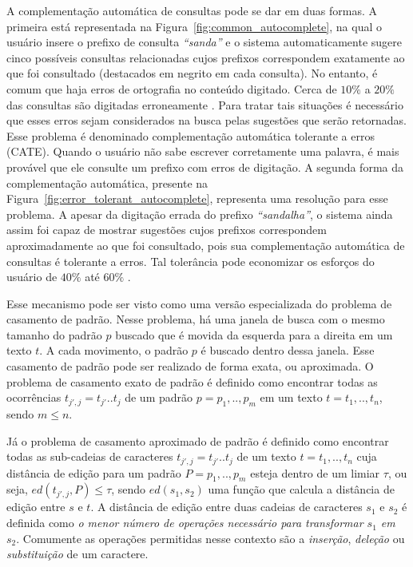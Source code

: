 A complementação automática de consultas pode se dar em duas formas. A primeira está representada na Figura~\ref{fig:common_autocomplete}, na qual o usuário insere o prefixo de consulta \textit{``sanda''} e o sistema automaticamente sugere cinco possíveis consultas relacionadas cujos prefixos correspondem exatamente ao que foi consultado (destacados em negrito em cada consulta). No entanto, é comum que haja erros de ortografia no conteúdo digitado. Cerca de $10\%$ a $20\%$ das consultas são digitadas erroneamente \citep{broder2009}. Para tratar tais situações é necessário que esses erros sejam considerados na busca pelas sugestões que serão retornadas. Esse problema é denominado complementação automática  tolerante a erros (CATE). Quando o usuário não sabe escrever corretamente uma palavra, é mais provável que ele consulte um prefixo com erros de digitação. A segunda forma da complementação automática, presente na Figura~\ref{fig:error_tolerant_autocomplete}, representa uma resolução para esse problema. A apesar da digitação errada do prefixo \textit{``sandalha''}, o sistema ainda assim foi capaz de mostrar sugestões cujos prefixos correspondem aproximadamente ao que foi consultado, pois sua complementação automática de consultas é tolerante a erros. Tal tolerância pode economizar os esforços do usuário de $40\%$ até $60\%$ \citep{ji2009efficient}.

Esse mecanismo pode ser visto como uma versão especializada do problema de casamento de padrão. Nesse problema, há uma janela de busca com o mesmo tamanho do padrão $p$ buscado que é movida da esquerda para a direita em um texto $t$. A cada movimento, o padrão $p$ é buscado dentro dessa janela. Esse casamento de padrão pode ser realizado de forma exata, ou aproximada. O problema de casamento exato de padrão é definido como encontrar todas as ocorrências $t_{j',j} = t_{j'}..t_{j}$ de um padrão $p = p_{1},..,p_{m}$ em um texto $t = t_{1},..,t_{n}$, sendo $m \leq n$.

Já o problema de casamento aproximado de padrão é definido como encontrar todas as sub-cadeias de caracteres $t_{j',j} = t_{j'}..t_{j}$ de um texto $t = t_{1},..,t_{n}$ cuja distância de edição para um padrão $P = p_{1},..,p_{m}$ esteja dentro de um limiar $\tau$, ou seja, $ed(t_{j',j}, P) \leq \tau$, sendo $ed(s_{1}, s_{2})$ uma função que calcula a distância de edição entre $s$ e $t$. A distância de edição entre duas cadeias de caracteres $s_{1}$ e $s_{2}$ é definida como \textit{o menor número de operações necessário para transformar $s_{1}$ em $s_{2}$}. Comumente as operações permitidas nesse contexto são a \textit{inserção}, \textit{deleção} ou \textit{substituição} de um caractere.

